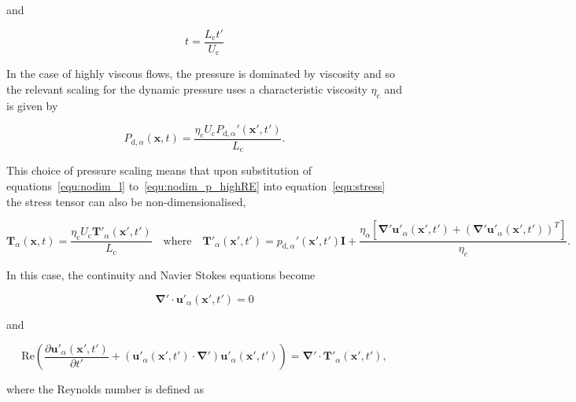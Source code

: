 \documentclass[12pt]{article}
\begin{document}
and 

\begin{equation}
\label{equ:nodim_t}
t = \frac{L_{\text{c}} t'}{U_{\text{c}}}
\end{equation}

In the case of highly viscous flows, the pressure is dominated by viscosity and so the relevant scaling for the dynamic pressure uses a characteristic viscosity $\eta_{\text{c}}$ and is given by\citet{Lee82}

\begin{equation}
\label{equ:nodim_p_highRE}
P_{\text{d},\alpha}(\boldsymbol{x},t) = \frac{\eta_{\text{c}} U_{\text{c}} P_{\text{d},\alpha}'(\boldsymbol{x'},t')}{L_{\text{c}}} .
\end{equation}

This choice of pressure scaling means that upon substitution of equations~\ref{equ:nodim_l} to~\ref{equ:nodim_p_highRE} into equation~\ref{equ:stress} the stress tensor can also be non-dimensionalised,

\begin{equation}
\label{equ:nodim_T}
\boldsymbol{T}_{\alpha}(\boldsymbol{x},t) = \frac{\eta_{\text{c}} U_{\text{c}} \boldsymbol{T'}_{\alpha}(\boldsymbol{x'},t')}{L_{\text{c}}} \quad \text{where} \quad \boldsymbol{T'}_{\alpha}(\boldsymbol{x'},t') = p_{\text{d},\alpha}'(\boldsymbol{x'},t') \boldsymbol{I} + \frac{\eta_{\alpha} [\boldsymbol\nabla' \boldsymbol{u'}_{\alpha}(\boldsymbol{x'},t') + (\boldsymbol\nabla' \boldsymbol{u'}_{\alpha}(\boldsymbol{x'},t'))^{T}]}{\eta_{c}} .
\end{equation}

In this case, the continuity and Navier Stokes equations become

\begin{equation}
\label{equ:nodim_cont}
\boldsymbol\nabla' \cdot \boldsymbol{u'}_{\alpha}(\boldsymbol{x'},t') = 0
\end{equation}

and

\begin{equation}
\label{equ:NS_low_Reynolds}
\text{Re} \left(\frac{\partial \boldsymbol{u'}_{\alpha}(\boldsymbol{x'},t')}{\partial t'} + (\boldsymbol{u'}_{\alpha}(\boldsymbol{x'},t') \cdot \boldsymbol\nabla') \boldsymbol{u'}_{\alpha}(\boldsymbol{x'},t') \right) = \boldsymbol\nabla' \cdot \boldsymbol{T'}_{\alpha}(\boldsymbol{x'},t') ,
\end{equation}

where the Reynolds number is defined as
\end{document}
